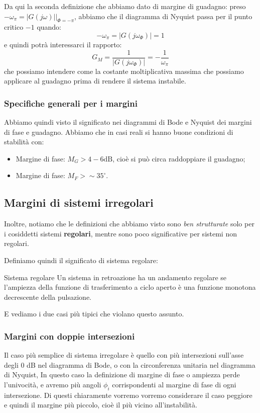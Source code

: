 \documentclass[a4paper,11pt]{article}
\begin{document}
Da qui la seconda definizione che abbiamo dato di margine di guadagno: preso $-\omega_\pi = |G(j \omega)| \big|_{\Phi = -\pi}$, abbiamo che il diagramma di Nyquist passa per il punto critico $-1$ quando:
$$
-\omega_\pi = |G(j\omega_\Phi)| = 1 
$$
e quindi potrà interessarci il rapporto:
$$
G_M = \frac{1}{|G(j\omega_\Phi)|} = -\frac{1}{\omega_\pi}
$$
che possiamo intendere come la costante moltiplicativa massima che possiamo applicare al guadagno prima di rendere il sistema instabile.

\subsubsection{Specifiche generali per i margini}

Abbiamo quindi visto il significato nei diagrammi di Bode e Nyquist dei margini di fase e guadagno.
Abbiamo che in casi reali si hanno buone condizioni di stabilità con:
\begin{itemize}
	\item Margine di fase: $M_G > 4 - 6 \mathrm{dB}$, cioè si può circa raddoppiare il guadagno;
	\item Margine di fase: $M_F > \sim 35^\circ$.
\end{itemize}

\subsection{Margini di sistemi irregolari}
Inoltre, notiamo che le definizioni che abbiamo visto sono \textit{ben strutturate} solo per i cosiddetti sistemi \textbf{regolari}, mentre sono poco significative per sistemi non regolari.

Definiamo quindi il significato di sistema regolare:
\begin{definition}{Sistema regolare}
	Un sistema in retroazione ha un andamento regolare se l'ampiezza della funzione di trasferimento a ciclo aperto è una funzione monotona decrescente della pulsazione.
\end{definition}

E vediamo i due casi più tipici che violano questo assunto.

\subsubsection{Margini con doppie intersezioni}
Il caso più semplice di sistema irregolare è quello con più intersezioni sull'asse degli 0 dB nel diagramma di Bode, o con la circonferenza unitaria nel diagramma di Nyquist, 
In questo caso la definizione di margine di fase o ampiezza perde l'univocità, e avremo più angoli $\phi_i$ corrispondenti al margine di fase di ogni intersezione.
Di questi chiaramente vorremo vorremo considerare il caso peggiore e quindi il margine più piccolo, cioè il più vicino all'instabilità.
\end{document}
